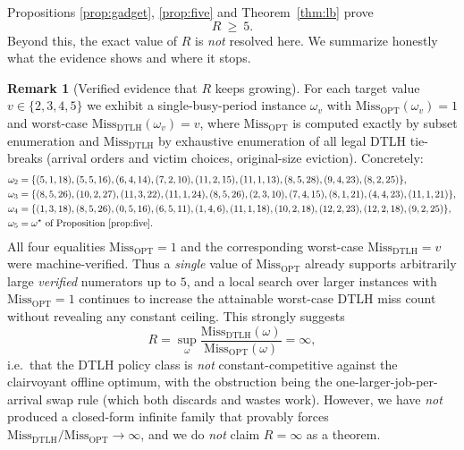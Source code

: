 \documentclass{amsart}
\theoremstyle{definition}
\newtheorem{remark}[theorem]{Remark}
\begin{document}
Propositions \ref{prop:gadget}, \ref{prop:five} and Theorem~\ref{thm:lb} prove
\[
R\ \ge\ 5 .
\]
Beyond this, the exact value of $R$ is \emph{not} resolved here. We summarize
honestly what the evidence shows and where it stops.

\begin{remark}[Verified evidence that $R$ keeps growing]\label{rem:grow}
For each target value $v\in\{2,3,4,5\}$ we exhibit a single-busy-period instance
$\omega_v$ with $\mathrm{Miss}_{\mathrm{OPT}}(\omega_v)=1$ and worst-case
$\mathrm{Miss}_{\mathrm{DTLH}}(\omega_v)=v$, where $\mathrm{Miss}_{\mathrm{OPT}}$
is computed exactly by subset enumeration and $\mathrm{Miss}_{\mathrm{DTLH}}$ by
exhaustive enumeration of all legal DTLH tie-breaks (arrival orders and victim
choices, original-size eviction). Concretely:
\begin{align*}
\omega_2&=\{(5,1,18),(5,5,16),(6,4,14),(7,2,10),(11,2,15),(11,1,13),(8,5,28),(9,4,23),(8,2,25)\},\\
\omega_3&=\{(8,5,26),(10,2,27),(11,3,22),(11,1,24),(8,5,26),(2,3,10),(7,4,15),(8,1,21),(4,4,23),(11,1,21)\},\\
\omega_4&=\{(1,3,18),(8,5,26),(0,5,16),(6,5,11),(1,4,6),(11,1,18),(10,2,18),(12,2,23),(12,2,18),(9,2,25)\},\\
\omega_5&=\omega^\star\text{ of Proposition~\ref{prop:five}}.
\end{align*}
All four equalities $\mathrm{Miss}_{\mathrm{OPT}}=1$ and the corresponding
worst-case $\mathrm{Miss}_{\mathrm{DTLH}}=v$ were machine-verified. Thus a
\emph{single} value of $\mathrm{Miss}_{\mathrm{OPT}}$ already supports
arbitrarily large \emph{verified} numerators up to $5$, and a local search over
larger instances with $\mathrm{Miss}_{\mathrm{OPT}}=1$ continues to increase the
attainable worst-case DTLH miss count without revealing any constant ceiling.
This strongly suggests
\[
R=\sup_\omega
\frac{\mathrm{Miss}_{\mathrm{DTLH}}(\omega)}{\mathrm{Miss}_{\mathrm{OPT}}(\omega)}
=\infty,
\]
i.e.\ that the DTLH policy class is \emph{not} constant-competitive against the
clairvoyant offline optimum, with the obstruction being the
one-larger-job-per-arrival swap rule (which both discards and wastes work).
However, we have \emph{not} produced a closed-form infinite family that provably
forces
$\mathrm{Miss}_{\mathrm{DTLH}}/\mathrm{Miss}_{\mathrm{OPT}}\to\infty$, and we do
\emph{not} claim $R=\infty$ as a theorem.
\end{remark}
\end{document}
